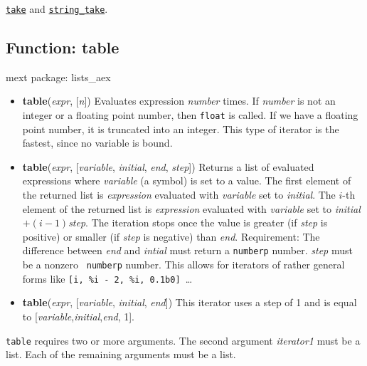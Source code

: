 \documentclass[]{article}
\begin{document}
\vspace{5 pt}


 \hyperlink{take}{{\tt take}} and \hyperlink{string_take}{{\tt string\_take}}.

\vspace{5 pt}


\subsection{Function: table\label{sec:table}}
\hypertarget{table}{}


\noindent mext package: lists\_aex



\vspace{5 pt}
\begin{itemize}
\item[] {\bf table}({\it expr}, [{\it n}])
  Evaluates expression {\it number} times. If {\it number} is not an integer or a floating point number, then {\tt float} is called. If we have a floating point number, it is truncated into an integer. This type of iterator is the fastest, since no variable is bound. 

\item[] {\bf table}({\it expr}, [{\it variable}, {\it initial}, {\it end}, {\it step}])
  Returns a list of evaluated expressions where {\it variable} (a symbol) is set to a value. The first element of the returned list is {\it expression} evaluated with {\it variable} set to {\it initial}. The $i$-th element of the returned list is {\it expression} evaluated with {\it variable} set to 
{\it initial}$ + (i-1) ${\it step}. The iteration stops once the value is greater (if {\it step} is positive) or smaller (if {\it step} is negative) than {\it end}. Requirement: The difference between {\it end} and {\it intial} must return a {\tt numberp} number. {\it step} must be a nonzero {\tt 
numberp} number. This allows for iterators of rather general forms like \verb#[i, %i - 2, %i, 0.1b0] #\ldots 

\item[] {\bf table}({\it expr}, [{\it variable}, {\it initial}, {\it end}])
  This iterator uses a step of 1 and is equal to [{\it variable},{\it initial},{\it end}, 1]. 

\end{itemize}
   {\tt table} requires two or more arguments.
    The second argument {\it iterator1} must be a list.
   Each of the remaining arguments must be a list.
\end{document}
